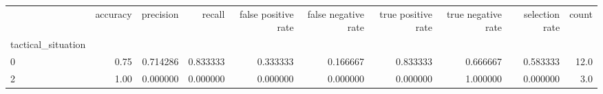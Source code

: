 \begin{tabular}{lrrrrrrrrr}
\toprule
{} &  accuracy &  precision &    recall &  false positive rate &  false negative rate &  true positive rate &  true negative rate &  selection rate &  count \\
tactical\_situation &           &            &           &                      &                      &                     &                     &                 &        \\
\midrule
0                  &      0.75 &   0.714286 &  0.833333 &             0.333333 &             0.166667 &            0.833333 &            0.666667 &        0.583333 &   12.0 \\
2                  &      1.00 &   0.000000 &  0.000000 &             0.000000 &             0.000000 &            0.000000 &            1.000000 &        0.000000 &    3.0 \\
\bottomrule
\end{tabular}
